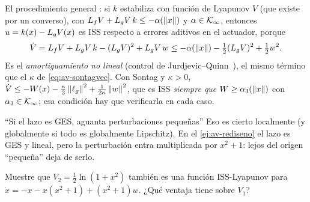 

El procedimiento general \citep[\S9.2]{KeBr23}: si $k$ estabiliza con función de Lyapunov $V$ (que existe por un converso), con $L_{f}V+L_{g}V\,k\le-\alpha(\left\lVert x\right\rVert)$ y $\alpha\in\mathcal{K}_{\infty}$, entonces $u=k(x)-L_{g}V(x)$ es ISS respecto a errores aditivos en el actuador, porque
\[
  \dot V=L_{f}V+L_{g}V\,k-(L_{g}V)^2+L_{g}V\,w\le-\alpha(\left\lVert x\right\rVert)-\tfrac12(L_{g}V)^2+\tfrac12w^2 .
\]
Es el \emph{amortiguamiento no lineal} (control de Jurdjevic--Quinn~\citep{JuQu78}), el mismo término que el $\kappa$ de \eqref{eq:av-sontagvec}. Con Sontag y $\kappa>0$, $\dot V\le-W(x)-\frac\kappa2\left\lVert \ell_g\right\rVert^2+\frac1{2\kappa}\left\lVert w\right\rVert^2$, que es ISS \emph{siempre que} $W\ge\alpha_3(\left\lVert x\right\rVert)$ con $\alpha_3\in\mathcal{K}_{\infty}$; esa condición hay que verificarla en cada caso.

\begin{trampa}[label=tr:av-robustecer]{``Si el lazo es GES, aguanta perturbaciones pequeñas''}
Eso es cierto localmente (y globalmente si todo es globalmente Lipschitz). En el \cref{ej:av-rediseno} el lazo es GES y lineal, pero la perturbación entra multiplicada por $x^2+1$: lejos del origen ``pequeña'' deja de serlo.
\end{trampa}

\begin{pausa}
Muestre que $V_2=\tfrac12\ln(1+x^2)$ también es una función ISS-Lyapunov para $\dot x=-x-x(x^2+1)+(x^2+1)w$. ¿Qué ventaja tiene sobre $V_1$?
\end{pausa}
